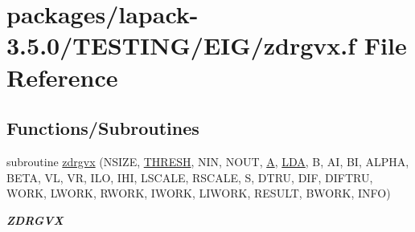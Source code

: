 \hypertarget{zdrgvx_8f}{}\section{packages/lapack-\/3.5.0/\+T\+E\+S\+T\+I\+N\+G/\+E\+I\+G/zdrgvx.f File Reference}
\label{zdrgvx_8f}
\subsection*{Functions/\+Subroutines}
\begin{DoxyCompactItemize}
\item 
subroutine \hyperlink{group__complex16__eig_ga15555ac728d52bb12042d5b57152ecff}{zdrgvx} (N\+S\+I\+Z\+E, \hyperlink{zlaqgs_8c_a0656018abfc9fa2821827415f5d5ea57}{T\+H\+R\+E\+S\+H}, N\+I\+N, N\+O\+U\+T, \hyperlink{classA}{A}, \hyperlink{example__user_8c_ae946da542ce0db94dced19b2ecefd1aa}{L\+D\+A}, B, A\+I, B\+I, A\+L\+P\+H\+A, B\+E\+T\+A, V\+L, V\+R, I\+L\+O, I\+H\+I, L\+S\+C\+A\+L\+E, R\+S\+C\+A\+L\+E, S, D\+T\+R\+U, D\+I\+F, D\+I\+F\+T\+R\+U, W\+O\+R\+K, L\+W\+O\+R\+K, R\+W\+O\+R\+K, I\+W\+O\+R\+K, L\+I\+W\+O\+R\+K, R\+E\+S\+U\+L\+T, B\+W\+O\+R\+K, I\+N\+F\+O)
\begin{DoxyCompactList}\small\item\em {\bfseries Z\+D\+R\+G\+V\+X} \end{DoxyCompactList}\end{DoxyCompactItemize}
